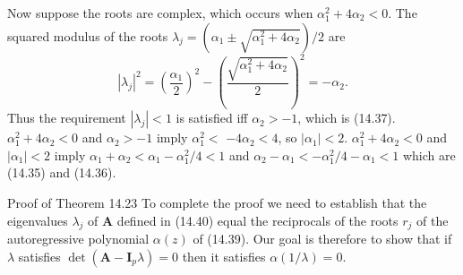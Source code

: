 \documentclass[10pt]{article}
\begin{document}
Now suppose the roots are complex, which occurs when $\alpha_{1}^{2}+4 \alpha_{2}<0$. The squared modulus of the roots $\lambda_{j}=\left(\alpha_{1} \pm \sqrt{\alpha_{1}^{2}+4 \alpha_{2}}\right) / 2$ are
$$
\left|\lambda_{j}\right|^{2}=\left(\frac{\alpha_{1}}{2}\right)^{2}-\left(\frac{\sqrt{\alpha_{1}^{2}+4 \alpha_{2}}}{2}\right)^{2}=-\alpha_{2} .
$$
Thus the requirement $\left|\lambda_{j}\right|<1$ is satisfied iff $\alpha_{2}>-1$, which is (14.37). $\alpha_{1}^{2}+4 \alpha_{2}<0$ and $\alpha_{2}>-1$ imply $\alpha_{1}^{2}<$ $-4 \alpha_{2}<4$, so $\left|\alpha_{1}\right|<2$. $\alpha_{1}^{2}+4 \alpha_{2}<0$ and $\left|\alpha_{1}\right|<2$ imply $\alpha_{1}+\alpha_{2}<\alpha_{1}-\alpha_{1}^{2} / 4<1$ and $\alpha_{2}-\alpha_{1}<-\alpha_{1}^{2} / 4-\alpha_{1}<1$ which are (14.35) and (14.36).

Proof of Theorem 14.23 To complete the proof we need to establish that the eigenvalues $\lambda_{j}$ of $\boldsymbol{A}$ defined in (14.40) equal the reciprocals of the roots $r_{j}$ of the autoregressive polynomial $\alpha(z)$ of (14.39). Our goal is therefore to show that if $\lambda$ satisfies $\operatorname{det}\left(\boldsymbol{A}-\boldsymbol{I}_{p} \lambda\right)=0$ then it satisfies $\alpha(1 / \lambda)=0$.
\end{document}

